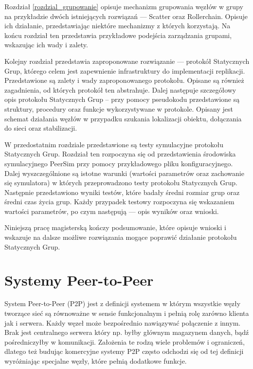 \documentclass[12pt, twoside, openany]{report}
\begin{document}
Rozdział \ref{rozdzial_grupowanie} opisuje mechanizm grupowania węzłów w grupy na przykładzie dwóch istniejących rozwiązań --- Scatter oraz Rollerchain. Opisuje ich działanie, przedstawiając niektóre mechanizmy z których korzystają. Na końcu rozdział ten przedstawia przykładowe podejścia zarządzania grupami, wskazując ich wady i zalety.

Kolejny rozdział przedstawia zaproponowane rozwiązanie --- protokół Statycznych Grup, którego celem jest zapewnienie infrastruktury do implementacji replikacji. Przedstawione są zalety i wady zaproponowanego protokołu. Opisane są również zagadnienia, od których protokół ten abstrahuje. Dalej następuje szczegółowy opis protokołu Statycznych Grup -- przy pomocy pseudokodu przedstawione są struktury, procedury oraz funkcje wykorzystywane w protokole. Opisany jest schemat działania węzłów w przypadku szukania lokalizacji obiektu, dołączania do sieci oraz stabilizacji.

W przedostatnim rozdziale przedstawione są testy symulacyjne protokołu Statycznych Grup. Rozdział ten rozpoczyna się od przedstawienia środowiska symulacyjnego PeerSim przy pomocy przykładowego pliku konfiguracyjnego. Dalej wyszczególnione są istotne warunki (wartości parametrów oraz zachowanie się symulatora) w których przeprowadzono testy protokołu Statycznych Grup. Następnie przedstawiono wyniki testów, które badały średni rozmiar grup oraz średni czas życia grup. Każdy przypadek testowy rozpoczyna się wskazaniem wartości parametrów, po czym następują --- opis wyników oraz wnioski. 

Niniejszą pracę magisterską kończy podsumowanie, które opisuje wnioski i wskazuje na dalsze możliwe rozwiązania mogące poprawić działanie protokołu Statycznych Grup.

\chapter{Systemy Peer-to-Peer}

System Peer-to-Peer (P2P) \cite{bib:martins, bib:jeyasheeli, bib:chord} jest z definicji systemem w którym wszystkie węzły tworzące sieć są równoważne w sensie funkcjonalnym i pełnią rolę zarówno klienta jak i serwera. Każdy węzeł może bezpośrednio nawiązywać połączenie z innym. Brak jest centralnego serwera który np. byłby głównym magazynem danych, bądź pośredniczyłby w komunikacji. Założenia te rodzą wiele problemów i ograniczeń, dlatego też budując komercyjne systemy P2P często odchodzi się od tej definicji wyróżniając specjalne węzły, które pełnią dodatkowe funkcje.
\end{document}
